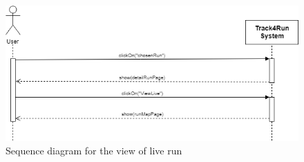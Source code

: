 \begin{figure}[H]
    \centering
    \includegraphics[scale=0.4]{Pictures/viewLiveRun.png}
    \caption{Sequence diagram for the view of live run}
\end{figure}
